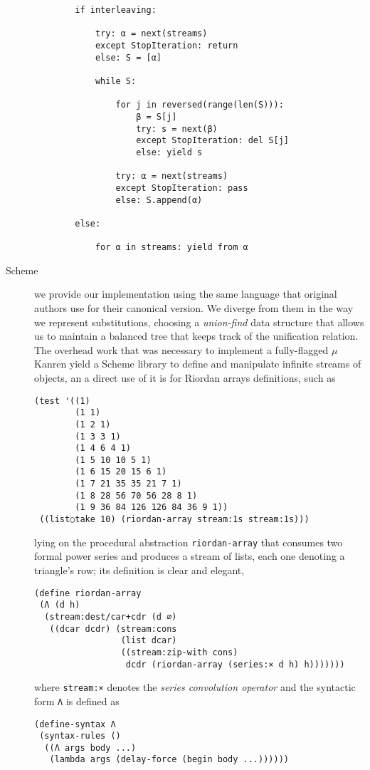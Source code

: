 \begin{description}
\begin{verbatim}
        if interleaving:

            try: α = next(streams)
            except StopIteration: return
            else: S = [α]

            while S:

                for j in reversed(range(len(S))):
                    β = S[j]
                    try: s = next(β)
                    except StopIteration: del S[j]
                    else: yield s

                try: α = next(streams)
                except StopIteration: pass
                else: S.append(α)

        else:

            for α in streams: yield from α
    \end{verbatim}

\item[Scheme] we provide our implementation using the same language that
original authors use for their canonical version. We diverge from them in the
way we represent substitutions, choosing a \textit{union-find}  data structure
that allows us to maintain a balanced tree that keeps track of the unification
relation. The overhead work that was necessary to implement a fully-flagged
$\mu$Kanren yield a Scheme library to define and manipulate infinite streams of
objects, an a direct use of it is for Riordan arrays definitions, such as
\vfill
\begin{verbatim}
(test '((1)
        (1 1)
        (1 2 1)
        (1 3 3 1)
        (1 4 6 4 1)
        (1 5 10 10 5 1)
        (1 6 15 20 15 6 1)
        (1 7 21 35 35 21 7 1)
        (1 8 28 56 70 56 28 8 1)
        (1 9 36 84 126 126 84 36 9 1))
 ((list○take 10) (riordan-array stream:1s stream:1s)))
\end{verbatim}
lying on the procedural abstraction \verb|riordan-array| that consumes two
formal power series and produces a stream of lists, each one denoting a
triangle's row; its definition is clear and elegant,
\begin{verbatim}
(define riordan-array
 (Λ (d h)
  (stream:dest/car+cdr (d ∅)
   ((dcar dcdr) (stream:cons
                 (list dcar)
                 ((stream:zip-with cons)
                  dcdr (riordan-array (series:× d h) h)))))))
\end{verbatim}
where \verb|stream:×| denotes the \textit{series convolution operator} and
the syntactic form \verb|Λ| is defined as
\begin{verbatim}
(define-syntax Λ
 (syntax-rules ()
  ((Λ args body ...)
   (lambda args (delay-force (begin body ...))))))
\end{verbatim}


\end{description}
